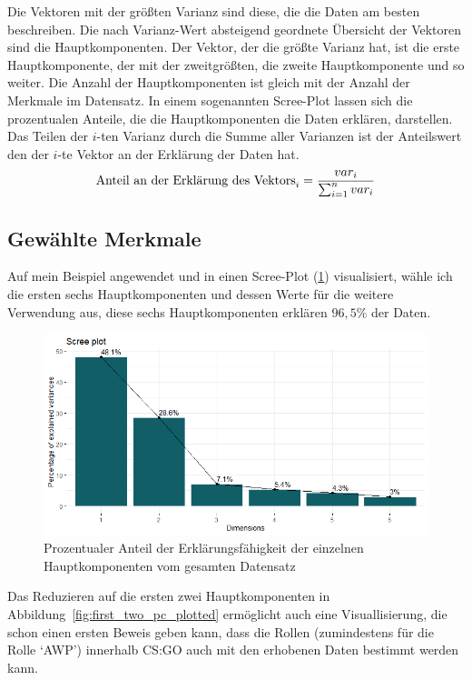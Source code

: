 \documentclass[envcountsame, envcountchap, deutsch]{i-studis}
\begin{document}
Die Vektoren mit der größten Varianz sind diese, die die Daten am besten beschreiben. Die nach Varianz-Wert absteigend geordnete Übersicht der Vektoren sind die 
Hauptkomponenten. Der Vektor, der die größte Varianz hat, ist die erste Hauptkomponente, der mit der zweitgrößten, die zweite 
Hauptkomponente und so weiter. Die Anzahl der Hauptkomponenten ist gleich mit der Anzahl der Merkmale im Datensatz. In einem sogenannten 
Scree-Plot lassen sich die prozentualen Anteile, die die Hauptkomponenten die Daten erklären, darstellen.
Das Teilen der $i$-ten Varianz durch die Summe aller Varianzen ist der Anteilswert den der $i$-te Vektor an der Erklärung der Daten hat.
\begin{align}
    \textnormal{Anteil an der Erklärung des Vektors}_{i} = \frac{var_{i}}{\sum _{i=1}^{n} {var_{i}}} 
\end{align}

\subsection{Gewählte Merkmale}
Auf mein Beispiel angewendet und in einen Scree-Plot (\ref{fig:screeplot}) visualisiert, wähle ich die ersten sechs Hauptkomponenten und dessen Werte für die weitere Verwendung aus, diese sechs Hauptkomponenten erklären
$96,5\%$ der Daten.

\vspace{1ex}
\begin{figure}
    \includegraphics[width=\textwidth]{screeplot.png}
    \caption{Prozentualer Anteil der Erklärungsfähigkeit der einzelnen Hauptkomponenten vom gesamten Datensatz}\label{fig:screeplot}
\end{figure}

Das Reduzieren auf die ersten zwei Hauptkomponenten in Abbildung~\ref{fig:first_two_pc_plotted} ermöglicht auch eine Visuallisierung, die schon einen ersten Beweis geben kann, dass die Rollen (zumindestens für die Rolle `AWP') innerhalb CS:GO auch mit den erhobenen Daten 
bestimmt werden kann.
\end{document}
